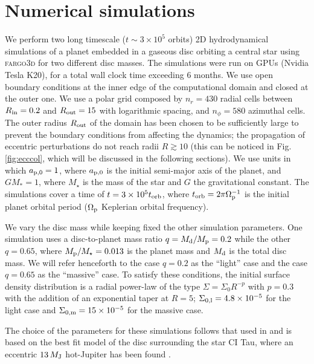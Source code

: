 \documentclass[usenatbib,a4paper,times,fleqn]{mnras}
\begin{document}
\section{Numerical simulations}\label{numsim}

We perform two long timescale ($t\sim 3\times10^5$ orbits) 2D hydrodynamical simulations of a planet embedded in a gaseous disc orbiting a central star using \textsc{fargo3d} \citep{fargo2016} for two different disc masses. The simulations were run on GPUs (Nvidia Tesla K20), for a total wall clock time exceeding 6 months. We use open boundary conditions at the inner edge of the computational domain and closed at the outer one. We use a polar grid composed by $n_r=430$ radial cells between $R_{\rm in}=0.2$ and $R_{\rm out}=15$ with logarithmic spacing, and $n_\phi=580$ azimuthal cells. The outer radius $R_{\rm out}$ of the domain has been chosen to be sufficiently large to prevent the boundary conditions from affecting the dynamics; the propagation of eccentric perturbations do not reach radii $R\gtrsim 10$ (this can be noticed in Fig. \ref{fig:ecccol}, which will be discussed in the following sections).
 We use units in which $a_{\rm p,0}=1$, where $a_{\rm p,0}$ is the initial semi-major axis of the planet, and $GM_\ast=1$, where $M_\star$ is the mass of the star and $G$ the gravitational constant. The simulations cover a time of $t=3\times 10^5 t_{\rm orb}$, where $t_{\rm orb}=2\pi\Omega_{\rm p}^{-1}$ is the initial planet orbital period ($\Omega_{\rm p}$ Keplerian orbital frequency).

We vary the disc mass while keeping fixed the other simulation parameters. One simulation uses a disc-to-planet mass ratio $q=M_{\rm d}/M_{\rm p}=0.2$ while the other $q=0.65$, where $M_{\rm p}/M_\star=0.013$ is the planet mass and $M_{\rm d}$ is the total disc mass. We will refer henceforth to the case $q=0.2$ as the ``light'' case and the case $q=0.65$ as the ``massive'' case. To satisfy these conditions, the initial surface density distribution is a radial power-law of the type $\Sigma=\Sigma_0 R^{-p}$ with $p=0.3$ with the addition of an exponential taper at $R=5$; $\Sigma_{0,{\rm l}}=4.8\times 10^{-5}$ for the light case and $\Sigma_{0,{\rm m}}=15\times 10^{-5}$ for the massive case. 

The choice of the parameters for these simulations follows that used in \citet{rosotti2017} and is based on the best fit model of the disc surrounding the star CI Tau, where an eccentric $13\, M_{\rm J}$ hot-Jupiter has been found \citep{krull2016}.
\end{document}

